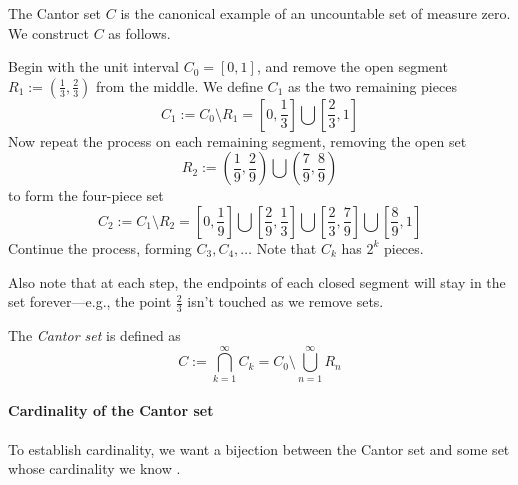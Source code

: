 \documentclass[12pt]{article}
\newcommand{\defined}{:=}
\begin{document}

The Cantor set $C$ is the canonical example of an uncountable set of measure zero.  We construct $C$ as follows.

Begin with the unit interval $C_0 = [0,1]$, and remove the open segment $R_1 \defined (\frac{1}{3},\frac{2}{3})$ from the middle.  We 
define $C_1$ as the two remaining pieces
\begin{equation}
C_1 \defined C_0 \setminus R_1 = \left[0,\frac{1}{3}\right] \bigcup \left[\frac{2}{3},1\right]
\end{equation}
Now repeat the process on each remaining segment, removing the open set
\begin{equation}
R_2 \defined \left(\frac{1}{9},\frac{2}{9}\right) \bigcup \left(\frac{7}{9},\frac{8}{9}\right)
\end{equation}
to form the four-piece set
\begin{equation}
C_2 \defined C_1 \setminus R_2 = \left[0,\frac{1}{9}\right] \bigcup \left[\frac{2}{9},\frac{1}{3}\right] \bigcup \left[\frac{2}{3},\frac{7}{9}\right] \bigcup \left[\frac{8}{9},1\right]
\end{equation}
Continue the process, forming $C_3, C_4, \ldots$  Note that $C_k$ has $2^k$ pieces.
\newline

Also note that at each step, the endpoints of each closed segment will stay in the set forever---e.g., the point $\frac{2}{3}$ isn't 
touched as we remove sets.

The \emph{Cantor set} is defined as
\begin{equation}
C \defined \bigcap_{k=1}^{\infty} C_k = C_0 \setminus \bigcup_{n=1}^{\infty}R_n
\end{equation}

\paragraph{Cardinality of the Cantor set}
To establish cardinality, we want a bijection between the Cantor set
and some set whose cardinality we know .
\end{document}
